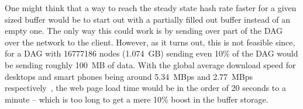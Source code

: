 \documentclass[runningheads]{llncs}
\begin{document}
One might think that a way to reach the steady state hash rate faster for a given sized buffer would be to start out with a partially filled out buffer instead of an empty one. The only way this could work is by sending over part of the DAG over the network to the client. However, as it turns out, this is not feasible since, for a DAG with 16777186 nodes (1.074~GB) sending even 10\% of the DAG would be sending roughly 100~MB of data. With the global average download speed for desktops and smart phones being around 5.34~MBps and 2.77~MBps respectively~\cite{internetSpeed}, the web page load time would be in the order of 20 seconds to a minute -- which is too long to get a mere 10\% boost in the buffer storage. 

\begin{figure}[t]
\captionsetup{justification=centering}
       \centering
\end{figure}
\end{document}
